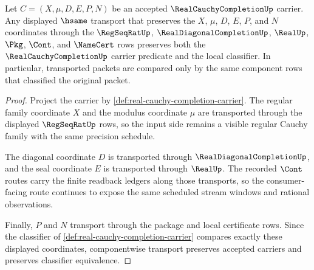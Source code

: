 \begin{theorem}
\label{thm:real-cauchy-completion-carrier-transport-stability}
Let $C=(X,\mu,D,E,P,N)$ be an accepted $\RealCauchyCompletionUp$ carrier. Any displayed $\hsame$ transport that preserves the $X$, $\mu$, $D$, $E$, $P$, and $N$ coordinates through the $\RegSeqRatUp$, $\RealDiagonalCompletionUp$, $\RealUp$, $\Pkg$, $\Cont$, and $\NameCert$ rows preserves both the $\RealCauchyCompletionUp$ carrier predicate and the local classifier. In particular, transported packets are compared only by the same component rows that classified the original packet.
\end{theorem}
\begin{proof}
Project the carrier by \autoref{def:real-cauchy-completion-carrier}. The regular family coordinate $X$ and the modulus coordinate $\mu$ are transported through the displayed $\RegSeqRatUp$ rows, so the input side remains a visible regular Cauchy family with the same precision schedule.

The diagonal coordinate $D$ is transported through $\RealDiagonalCompletionUp$, and the seal coordinate $E$ is transported through $\RealUp$. The recorded $\Cont$ routes carry the finite readback ledgers along those transports, so the consumer-facing route continues to expose the same scheduled stream windows and rational observations.

Finally, $P$ and $N$ transport through the package and local certificate rows. Since the classifier of \autoref{def:real-cauchy-completion-carrier} compares exactly these displayed coordinates, componentwise transport preserves accepted carriers and preserves classifier equivalence.
\end{proof}

